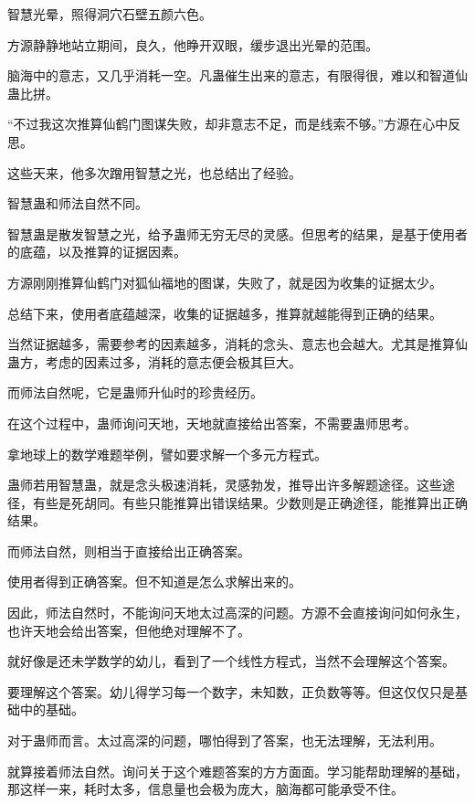 
\begin{this_body}

智慧光晕，照得洞穴石壁五颜六色。

方源静静地站立期间，良久，他睁开双眼，缓步退出光晕的范围。

脑海中的意志，又几乎消耗一空。凡蛊催生出来的意志，有限得很，难以和智道仙蛊比拼。

“不过我这次推算仙鹤门图谋失败，却非意志不足，而是线索不够。”方源在心中反思。

这些天来，他多次蹭用智慧之光，也总结出了经验。

智慧蛊和师法自然不同。

智慧蛊是散发智慧之光，给予蛊师无穷无尽的灵感。但思考的结果，是基于使用者的底蕴，以及推算的证据因素。

方源刚刚推算仙鹤门对狐仙福地的图谋，失败了，就是因为收集的证据太少。

总结下来，使用者底蕴越深，收集的证据越多，推算就越能得到正确的结果。

当然证据越多，需要参考的因素越多，消耗的念头、意志也会越大。尤其是推算仙蛊方，考虑的因素过多，消耗的意志便会极其巨大。

而师法自然呢，它是蛊师升仙时的珍贵经历。

在这个过程中，蛊师询问天地，天地就直接给出答案，不需要蛊师思考。

拿地球上的数学难题举例，譬如要求解一个多元方程式。

蛊师若用智慧蛊，就是念头极速消耗，灵感勃发，推导出许多解题途径。这些途径，有些是死胡同。有些只能推算出错误结果。少数则是正确途径，能推算出正确结果。

而师法自然，则相当于直接给出正确答案。

使用者得到正确答案。但不知道是怎么求解出来的。

因此，师法自然时，不能询问天地太过高深的问题。方源不会直接询问如何永生，也许天地会给出答案，但他绝对理解不了。

就好像是还未学数学的幼儿，看到了一个线性方程式，当然不会理解这个答案。

要理解这个答案。幼儿得学习每一个数字，未知数，正负数等等。但这仅仅只是基础中的基础。

对于蛊师而言。太过高深的问题，哪怕得到了答案，也无法理解，无法利用。

就算接着师法自然。询问关于这个难题答案的方方面面。学习能帮助理解的基础，那这样一来，耗时太多，信息量也会极为庞大，脑海都可能承受不住。


\end{this_body}
